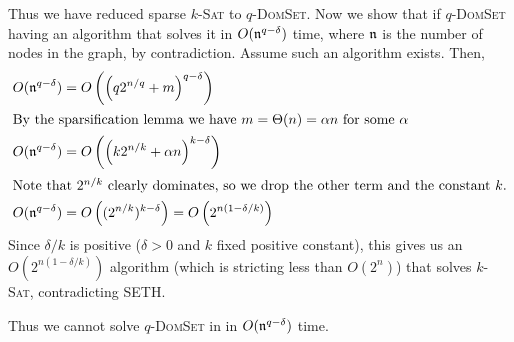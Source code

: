\documentclass[12pt]{article}
\begin{document}
\begin{solution}
    Thus we have reduced sparse $k$-\textsc{Sat} to $q$-\textsc{DomSet}. 
    Now we show that if $q$-\textsc{DomSet} having an algorithm that solves it in $O(\operatorname{\mathfrak{n}}^{q-\delta})$ time, where $\operatorname{\mathfrak{n}}$ is the number of nodes in the graph, by contradiction. Assume such an algorithm exists. Then, 
    \begin{align*}
        O(\operatorname{\mathfrak{n}}^{q-\delta}) &= O\left(\left(q2^{n/q} + m\right)^{q-\delta}\right) \\ 
        \intertext{By the sparsification lemma we have $m = \Theta(n) = \alpha n$ for some $\alpha$}
        O(\operatorname{\mathfrak{n}}^{q-\delta}) &= O\left(\left(k2^{n/k} + \alpha n\right)^{k - \delta}\right) \\ 
        \intertext{Note that $2^{n/k}$ clearly dominates, so we drop the other term and the constant $k$.}
        O(\operatorname{\mathfrak{n}}^{q-\delta}) &=  O\left((2^{n/k})^{k - \delta}\right) = O\left(2^{n(1 - \delta/k)}\right)
    \end{align*}
    Since $\delta/k$ is positive ($\delta > 0$ and $k$ fixed positive constant), this gives us an $O(2^{n(1-\delta/k)})$  algorithm (which is stricting less than $O(2^n)$) that solves $k$-\textsc{Sat}, contradicting SETH. 
    
    Thus we cannot solve $q$-\textsc{DomSet} in in $O(\operatorname{\mathfrak{n}}^{q-\delta})$ time.  
\end{solution}
\end{document}
